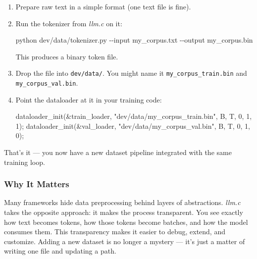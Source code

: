 \documentclass[
  letterpaper,
  DIV=11,
  numbers=noendperiod]{scrreprt}
\newenvironment{Shaded}{\begin{snugshade}}{\end{snugshade}}
\newcommand{\AttributeTok}[1]{\textcolor[rgb]{0.40,0.45,0.13}{#1}}
\newcommand{\DecValTok}[1]{\textcolor[rgb]{0.68,0.00,0.00}{#1}}
\newcommand{\ExtensionTok}[1]{\textcolor[rgb]{0.00,0.23,0.31}{#1}}
\newcommand{\NormalTok}[1]{\textcolor[rgb]{0.00,0.23,0.31}{#1}}
\newcommand{\OperatorTok}[1]{\textcolor[rgb]{0.37,0.37,0.37}{#1}}
\newcommand{\StringTok}[1]{\textcolor[rgb]{0.13,0.47,0.30}{#1}}
\begin{document}
\begin{enumerate}
\def\labelenumi{\arabic{enumi}.}
\item
  Prepare raw text in a simple format (one text file is fine).
\item
  Run the tokenizer from \emph{llm.c} on it:

\begin{Shaded}
\begin{Highlighting}[]
\ExtensionTok{python}\NormalTok{ dev/data/tokenizer.py }\AttributeTok{{-}{-}input}\NormalTok{ my\_corpus.txt }\AttributeTok{{-}{-}output}\NormalTok{ my\_corpus.bin}
\end{Highlighting}
\end{Shaded}

  This produces a binary token file.
\item
  Drop the file into \texttt{dev/data/}. You might name it
  \texttt{my\_corpus\_train.bin} and \texttt{my\_corpus\_val.bin}.
\item
  Point the dataloader at it in your training code:

\begin{Shaded}
\begin{Highlighting}[]
\NormalTok{dataloader\_init}\OperatorTok{(\&}\NormalTok{train\_loader}\OperatorTok{,} \StringTok{"dev/data/my\_corpus\_train.bin"}\OperatorTok{,}\NormalTok{ B}\OperatorTok{,}\NormalTok{ T}\OperatorTok{,} \DecValTok{0}\OperatorTok{,} \DecValTok{1}\OperatorTok{,} \DecValTok{1}\OperatorTok{);}
\NormalTok{dataloader\_init}\OperatorTok{(\&}\NormalTok{val\_loader}\OperatorTok{,} \StringTok{"dev/data/my\_corpus\_val.bin"}\OperatorTok{,}\NormalTok{ B}\OperatorTok{,}\NormalTok{ T}\OperatorTok{,} \DecValTok{0}\OperatorTok{,} \DecValTok{1}\OperatorTok{,} \DecValTok{0}\OperatorTok{);}
\end{Highlighting}
\end{Shaded}
\end{enumerate}

That's it --- you now have a new dataset pipeline integrated with the
same training loop.

\subsubsection{Why It Matters}\label{why-it-matters-56}

Many frameworks hide data preprocessing behind layers of abstractions.
\emph{llm.c} takes the opposite approach: it makes the process
transparent. You see exactly how text becomes tokens, how those tokens
become batches, and how the model consumes them. This transparency makes
it easier to debug, extend, and customize. Adding a new dataset is no
longer a mystery --- it's just a matter of writing one file and updating
a path.
\end{document}
